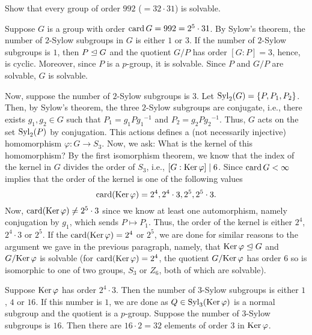 \begin{problem}
  Show that every group of order $992$ ($=32\cdot 31$) is solvable.
\end{problem}
\begin{solution}
  Suppose $G$ is a group with order $\operatorname{card} G=992=2^5\cdot 31$. By Sylow's
  theorem, the number of $2$-Sylow subgroups in $G$ is either $1$ or
  $3$. If the number of $2$-Sylow subgroups is $1$, then $P\trianglelefteq G$ and
  the quotient $G/P$ has order $[G:P]=3$, hence, is cyclic. Moreover, since
  $P$ is a $p$-group, it is solvable. Since $P$ and $G/P$ are solvable, $G$
  is solvable.

  Now, suppose the number of $2$-Sylow subgroups is $3$. Let
  $\operatorname{Syl}_2(G)=\{P,P_1,P_2\}$. Then, by Sylow's theorem, the three $2$-Sylow
  subgroups are conjugate, i.e., there exists $g_1,g_2\in G$ such that
  $P_1=g_1P{g_1}^{-1}$ and $P_2=g_2P{g_2}^{-1}$. Thus, $G$ acts on the set
  $\operatorname{Syl}_2(P)$ by conjugation. This actions defines a (not necessarily
  injective) homomorphism $\varphi\colon G\to S_3$. Now, we ask: What is
  the kernel of this homomorphism? By the first isomorphism theorem, we
  know that the index of the kernel in $G$ divides the order of $S_3$,
  i.e., $[G:{\operatorname{Ker}\varphi}]\mid 6$. Since $\operatorname{card} G<\infty$ implies that the
  order of the kernel is one of the following values
  \[
    \operatorname{card}(\operatorname{Ker}\varphi)=2^4,2^4\cdot 3,2^5,2^5\cdot 3.
  \]
  Now, $\operatorname{card}(\operatorname{Ker}\varphi)\neq 2^5\cdot 3$ since we know at least one
  automorphism, namely conjugation by $g_1$, which sends $P\mapsto
  P_1$. Thus, the order of the kernel is either $2^4$, $2^4\cdot 3$ or
  $2^5$. If the $\operatorname{card}(\operatorname{Ker}\varphi)=2^4$ or $2^5$, we are done for similar
  reasons to the argument we gave in the previous paragraph, namely, that
  $\operatorname{Ker}\varphi\trianglelefteq G$ and $G/{\operatorname{Ker}\varphi}$ is solvable (for
  $\operatorname{card}(\operatorname{Ker}\varphi)=2^4$, the quotient $G/{\operatorname{Ker}\varphi}$ has order $6$ so
  is isomorphic to one of two groups, $S_3$ or $Z_6$, both of which are
  solvable).

  Suppose $\operatorname{Ker}\varphi$ has order $2^4\cdot 3$. Then the number of
  $3$-Sylow subgroups is either $1$, $4$ or $16$. If this number is $1$, we
  are done as $Q\in \operatorname{Syl}_3({\operatorname{Ker}\varphi})$ is a normal subgroup and the
  quotient is a $p$-group. Suppose the number of $3$-Sylow subgroups is
  $16$. Then there are $16\cdot 2=32$ elements of order $3$ in
  $\operatorname{Ker}\varphi$.
\end{solution}

